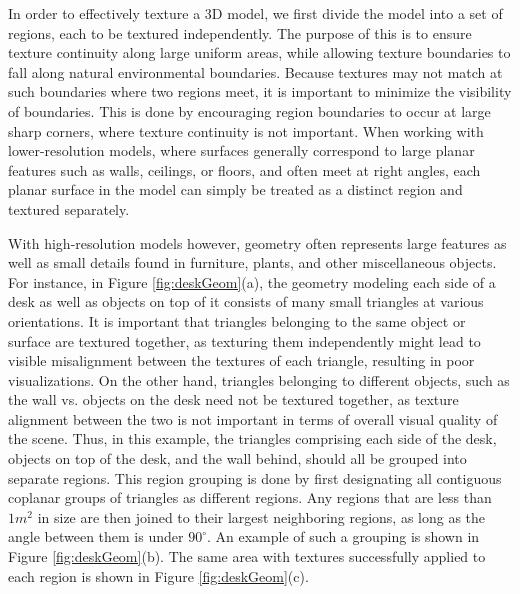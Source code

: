 \documentclass[]{spie}  %
\begin{document}
In order to effectively texture a 3D model, we first divide the model
into a set of regions, each to be textured independently. The purpose
of this is to ensure texture continuity along large uniform areas,
while allowing texture boundaries to fall along natural environmental
boundaries. Because textures may not match at such boundaries where
two regions meet, it is important to minimize the visibility of
boundaries. This is done by encouraging region boundaries to occur at
large sharp corners, where texture continuity is not important. When
working with lower-resolution models, where surfaces generally
correspond to large planar features such as walls, ceilings, or
floors, and often meet at right angles, each planar surface in the
model can simply be treated as a distinct region and textured
separately.

With high-resolution models however, geometry often represents large
features as well as small details found in furniture, plants, and
other miscellaneous objects. For instance, in Figure
\ref{fig:deskGeom}(a), the geometry modeling each side of a desk as
well as objects on top of it consists of many small triangles at
various orientations. It is important that triangles belonging to the
same object or surface are textured together, as texturing them
independently might lead to visible misalignment between the textures
of each triangle, resulting in poor visualizations. On the other hand,
triangles belonging to different objects, such as the wall vs. objects
on the desk need not be textured together, as texture alignment
between the two is not important in terms of overall visual quality of
the scene. Thus, in this example, the triangles comprising each side
of the desk, objects on top of the desk, and the wall behind, should
all be grouped into separate regions. This region grouping is done by
first designating all contiguous coplanar groups of triangles as
different regions. Any regions that are less than $1 m^2$ in size are
then joined to their largest neighboring regions, as long as the angle
between them is under $90^{\circ}$. An example of such a grouping is
shown in Figure \ref{fig:deskGeom}(b). The same area with textures
successfully applied to each region is shown in Figure
\ref{fig:deskGeom}(c).
\end{document}
